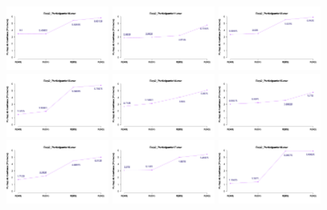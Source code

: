 \documentclass[a4paper ]{article}
\begin{document}
\begin{figure}[th]
\includegraphics[width=0.3\textwidth]{Figures/MirrorRating_Exp2_P10} \includegraphics[width=0.3\textwidth]{Figures/MirrorRating_Exp2_P11} \includegraphics[width=0.3\textwidth]{Figures/MirrorRating_Exp2_P12}
\includegraphics[width=0.3\textwidth]{Figures/MirrorRating_Exp2_P13} \includegraphics[width=0.3\textwidth]{Figures/MirrorRating_Exp2_P14} \includegraphics[width=0.3\textwidth]{Figures/MirrorRating_Exp2_P15}
\includegraphics[width=0.3\textwidth]{Figures/MirrorRating_Exp2_P16} \includegraphics[width=0.3\textwidth]{Figures/MirrorRating_Exp2_P17} \includegraphics[width=0.3\textwidth]{Figures/MirrorRating_Exp2_P18}

\end{figure}
\end{document}
